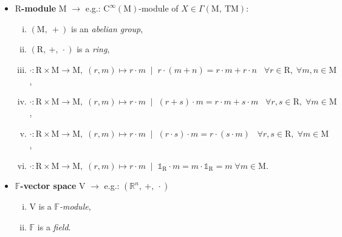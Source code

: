 \documentclass[10pt,a4paper]{article}
\begin{document}
\begin{itemize}
        \item $\mathrm{R}$\textbf{-module} $\mathrm{M}$ $\longrightarrow$ e.g.:
            $\mathrm{C}^{\infty}\left( \mathrm{M} \right)$-module of $X \in
            \Gamma\left( \mathrm{M},\ \mathrm{TM} \right)$:
            \begin{enumerate}[i)]
                \item $\left( \mathrm{M},\ + \right)$ is an \textit{abelian
                    group},
                \item $\left( \mathrm{R},\ +,\ \cdot \right)$ is a
                    \textit{ring},
                \item $\cdot \colon \mathrm{R} \times \mathrm{M} \rightarrow
                    \mathrm{M},\; \left( r, m \right) \mapsto r \cdot m\; \mid
                    \; r \cdot \left( m + n \right) = r \cdot m + r \cdot
                    n\;\;\; \forall r \in \mathrm{R},\; \forall m,n \in
                    \mathrm{M}$,
                \item $\cdot \colon \mathrm{R} \times \mathrm{M} \rightarrow
                    \mathrm{M},\; \left( r, m \right) \mapsto r \cdot m\; \mid
                    \; \left( r + s \right) \cdot m = r \cdot m + s
                    \cdot m\;\;\; \forall r,s \in \mathrm{R},\; \forall m \in
                    \mathrm{M}$,
                \item $\cdot \colon \mathrm{R} \times \mathrm{M} \rightarrow
                    \mathrm{M},\; \left( r, m \right) \mapsto r \cdot m\; \mid
                    \; \left( r \cdot s \right) \cdot m = r \cdot \left( s
                    \cdot m \right)\;\;\; \forall r,s \in \mathrm{R},\; \forall
                    m \in \mathrm{M}$,
                \item $\cdot \colon \mathrm{R} \times \mathrm{M} \rightarrow
                    \mathrm{M},\; \left( r, m \right) \mapsto r \cdot m\; \mid
                    \; \mathds{1}_{\mathrm{R}} \cdot m = m \cdot
                    \mathds{1}_{\mathrm{R}} = m\; \forall m \in \mathrm{M}$.
            \end{enumerate}

        \item $\mathds{F}$\textbf{-vector space} $\mathrm{V}$ $\longrightarrow$
            e.g.: $\left( \mathds{R}^n,\ +,\ \cdot \right)$
            \begin{enumerate}[i)]
                \item $\mathrm{V}$ is a $\mathds{F}$\textit{-module},
                \item $\mathds{F}$ is a \textit{field}.
            \end{enumerate}
    \end{itemize}
\end{document}
